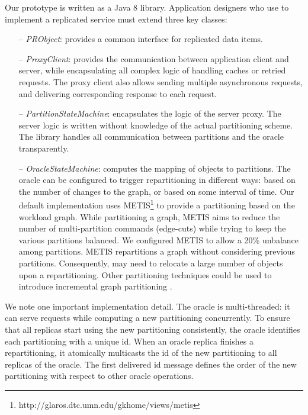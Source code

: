 Our  \dynastar prototype is written as a Java 8 library.
Application designers who use \dynastar to implement a replicated service must
 extend three key classes:
 \begin{itemize}
 \item[--] \emph{PRObject}: provides a common interface for replicated data
 items.
 \item[--] \emph{ProxyClient}: provides the communication between application
 client and server, while encapsulating all complex logic of handling caches or
 retried requests. The proxy client also allows sending multiple asynchronous
 requests, and delivering corresponding response to each request.
 \item[--] \emph{PartitionStateMachine}: encapsulates the logic of the server
   proxy. The server logic is written without knowledge of the actual
   partitioning scheme. The \dynastar library handles all communication between
   partitions and the oracle transparently.
 \item[--] \emph{OracleStateMachine}: computes the mapping of objects to
partitions. The oracle can be configured to trigger repartitioning in different
ways: based on the number of changes to the graph, or based on some interval of
time. Our default implementation uses
METIS\footnote{http://glaros.dtc.umn.edu/gkhome/views/metis} to provide a
partitioning based on the workload graph. While partitioning a graph, METIS aims
to reduce the number of multi-partition commands (edge-cuts) while trying to
keep the various partitions balanced. We configured METIS to allow a 20\%
unbalance among partitions. METIS repartitions a graph without considering
previous partitions. Consequently, \dynastar may need to relocate a large number
of objects upon a repartitioning. Other partitioning techniques could be used to
introduce incremental graph partitioning \cite{SerafiniTEPAS16}.
%
 \end{itemize}

 We note one important implementation detail.  The oracle is multi-threaded: it
 can serve requests while computing a new partitioning concurrently. To ensure
 that all replicas start using the new partitioning consistently, the oracle
 identifies each partitioning with a unique id.  When an oracle replica finishes
 a repartitioning, it atomically multicasts the id of the new partitioning to
 all replicas of the oracle.  The first delivered id message defines the order
 of the new partitioning with respect to other oracle operations.


